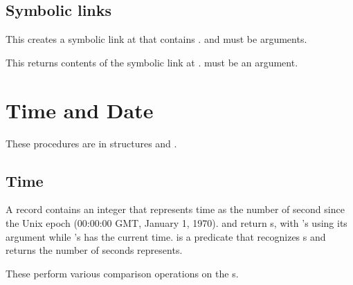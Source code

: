 \subsection{Symbolic links}

\begin{protos}
\end{protos}
%
This creates a symbolic link at  that contains .
 and  must be  arguments.

\begin{protos}
\end{protos}
%
This returns contents of the symbolic link at .
 must be an  argument.

\section{Time and Date}

These procedures are in structures  and .

\subsection{Time}

\begin{protos}
\end{protos}
\noindent
A  record contains an integer that represents time as
 the number of second since the Unix epoch (00:00:00 GMT, January 1, 1970).
 and  return \/s, with
 's using its argument while 's has
 the current time.
 is a predicate that recognizes \/s and
  returns the number of seconds  represents.

\begin{protos}
\end{protos}
\noindent
These perform various comparison operations on the \/s.

